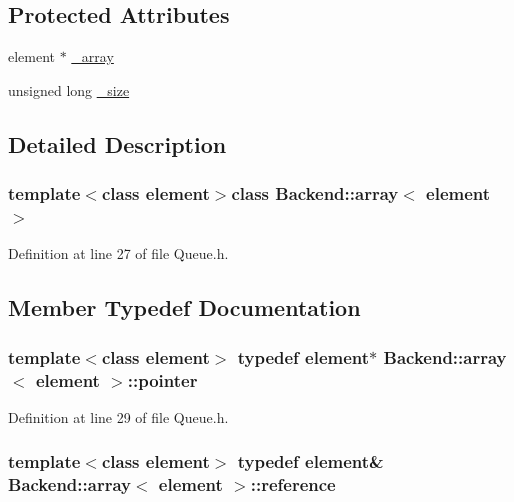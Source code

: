 \subsection*{Protected Attributes}
\begin{DoxyCompactItemize}
\item 
element $\ast$ \hyperlink{classBackend_1_1array_ac588c1e30c2c4748bc9a5bb12b9320af}{\+\_\+array}
\item 
unsigned long \hyperlink{classBackend_1_1array_ae51d64e87b42931946111c28b98e8a18}{\+\_\+size}
\end{DoxyCompactItemize}


\subsection{Detailed Description}
\subsubsection*{template$<$class element$>$class Backend\+::array$<$ element $>$}



Definition at line 27 of file Queue.\+h.



\subsection{Member Typedef Documentation}
\hypertarget{classBackend_1_1array_a6d8785dc8b979153ef122f4e3bad1408}{
\subsubsection[{pointer}]{\setlength{\rightskip}{0pt plus 5cm}template$<$class element$>$ typedef element$\ast$ {\bf Backend\+::array}$<$ element $>$\+::{\bf pointer}}}\label{classBackend_1_1array_a6d8785dc8b979153ef122f4e3bad1408}


Definition at line 29 of file Queue.\+h.

\hypertarget{classBackend_1_1array_aa98075b8d7a4e63ea919ee9d1d4df4a9}{
\subsubsection[{reference}]{\setlength{\rightskip}{0pt plus 5cm}template$<$class element$>$ typedef element\& {\bf Backend\+::array}$<$ element $>$\+::{\bf reference}}}\label{classBackend_1_1array_aa98075b8d7a4e63ea919ee9d1d4df4a9}


